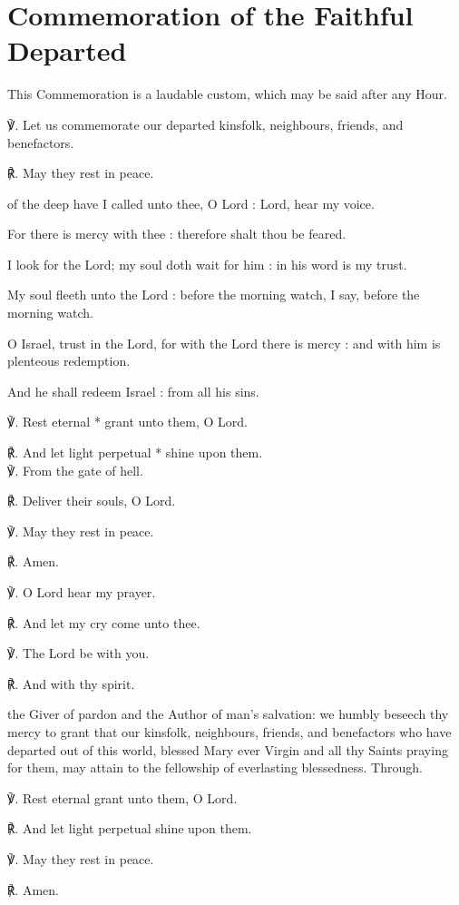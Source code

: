 \section{Commemoration of the Faithful Departed}
\fancyhead[RE,LO]{}
\begin{rubric}
    This Commemoration is a laudable custom, which may be said after any Hour.
\end{rubric}
\begin{multicols}{2}
℣. Let us commemorate our departed kinsfolk, neighbours, friends, and benefactors.

℟. May they rest in peace.


 of the deep have I called unto thee, O Lord : Lord, hear my voice.\par
{}
For there is mercy with thee : therefore shalt thou be feared.\par
{}I look for the Lord; my soul doth wait for him : in his word is my trust.\par
{}My soul fleeth unto the Lord : before the morning watch, I say, before the morning watch.\par
{}O Israel, trust in the Lord, for with the Lord there is mercy : and with him is plenteous redemption.\par
{}And he shall redeem Israel : from all his sins.\par
℣. Rest eternal * grant unto them, O Lord.\par
℟. And let light perpetual * shine upon them.\\

℣. From the gate of hell.\par
℟. Deliver their souls, O Lord.

℣. May they rest in peace.\par
℟. Amen.

℣. O Lord hear my prayer.\par
℟. And let my cry come unto thee.\par
℣. The Lord be with you.\par
℟. And with thy spirit.\par
{}
{} the Giver of pardon and the Author of man's salvation: we humbly beseech thy mercy to grant that our kinsfolk, neighbours, friends, and benefactors who have departed out of this world, blessed Mary ever Virgin and all thy Saints praying for them, may attain to the fellowship of everlasting blessedness. Through.

℣. Rest eternal grant unto them, O Lord.\par
℟. And let light perpetual shine upon them.\par
℣. May they rest in peace.\par
℟. Amen.
\end{multicols}